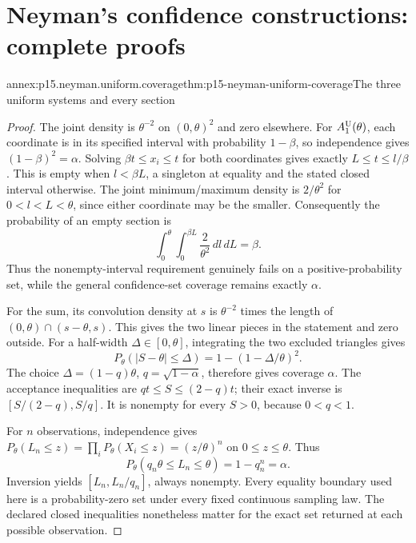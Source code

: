 \section{Neyman's confidence constructions: complete proofs}
\label{sec:annex-p15-neyman-confidence-constructions}

\begin{annexitem}{annex:p15.neyman.uniform.coverage}{thm:p15-neyman-uniform-coverage}{The three uniform systems and every section}
\begin{proof}
The joint density is \(\theta^{-2}\) on \((0,\theta)^2\)
and zero elsewhere. For \(A_1^{\rm U}(\theta)\), each coordinate
is in its specified interval with probability \(1-\beta\),
so independence gives \((1-\beta)^2=\alpha\).
Solving \(\beta t\leq x_i\leq t\) for both coordinates gives
exactly \(L\leq t\leq l/\beta\). This is empty when
\(l<\beta L\), a singleton at equality and the stated
closed interval otherwise.
The joint minimum/maximum density is \(2/\theta^2\) for
\(0<l<L<\theta\), since either coordinate may be the smaller.
Consequently the probability of an empty section is
\[
               \int_0^\theta\int_0^{\beta L}
                           \frac2{\theta^2}\,dl\,dL=\beta.
\]
Thus the nonempty-interval requirement genuinely fails on a
positive-probability set, while the general confidence-set
coverage remains exactly \(\alpha\).

For the sum, its convolution density at \(s\) is
\(\theta^{-2}\) times the length of
\((0,\theta)\cap(s-\theta,s)\). This gives the two
linear pieces in the statement and zero outside.
For a half-width \(\Delta\in[0,\theta]\), integrating
the two excluded triangles gives
\[
                    P_\theta(|S-\theta|\leq\Delta)
                         =1-(1-\Delta/\theta)^2.
\]
The choice \(\Delta=(1-q)\theta\), \(q=\sqrt{1-\alpha}\),
therefore gives coverage \(\alpha\).
The acceptance inequalities are \(qt\leq S\leq(2-q)t\);
their exact inverse is \([S/(2-q),S/q]\).
It is nonempty for every \(S>0\), because \(0<q<1\).

For \(n\) observations, independence gives
\(P_\theta(L_n\leq z)=\prod_iP_\theta(X_i\leq z)
=(z/\theta)^n\) on \(0\leq z\leq\theta\).
Thus
\[
                   P_\theta(q_n\theta\leq L_n\leq\theta)
                          =1-q_n^n=\alpha.
\]
Inversion yields \([L_n,L_n/q_n]\), always nonempty.
Every equality boundary used here is a probability-zero
set under every fixed continuous sampling law. The
declared closed inequalities nonetheless matter for
the exact set returned at each possible observation.
\end{proof}
\end{annexitem}

